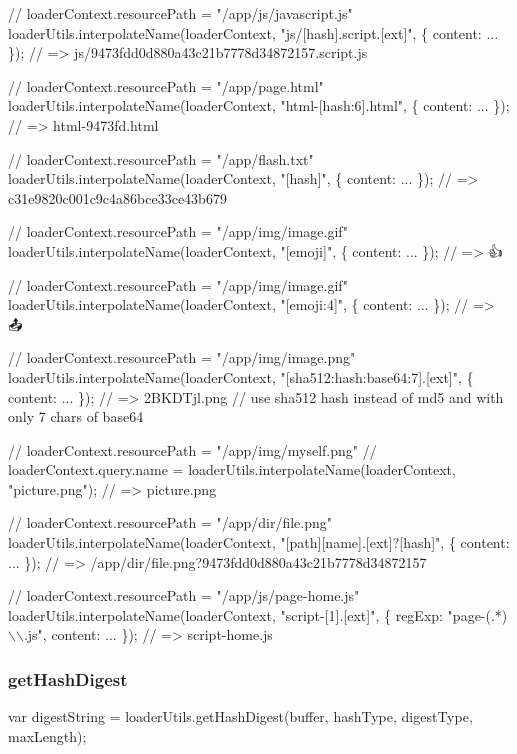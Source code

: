 \begin{DoxyCode}
// loaderContext.resourcePath = "/app/js/javascript.js"
loaderUtils.interpolateName(loaderContext, "js/[hash].script.[ext]", \{ content: ... \});
// => js/9473fdd0d880a43c21b7778d34872157.script.js

// loaderContext.resourcePath = "/app/page.html"
loaderUtils.interpolateName(loaderContext, "html-[hash:6].html", \{ content: ... \});
// => html-9473fd.html

// loaderContext.resourcePath = "/app/flash.txt"
loaderUtils.interpolateName(loaderContext, "[hash]", \{ content: ... \});
// => c31e9820c001c9c4a86bce33ce43b679

// loaderContext.resourcePath = "/app/img/image.gif"
loaderUtils.interpolateName(loaderContext, "[emoji]", \{ content: ... \});
// => 👍

// loaderContext.resourcePath = "/app/img/image.gif"
loaderUtils.interpolateName(loaderContext, "[emoji:4]", \{ content: ... \});
// => 🙍🏢📤🐝

// loaderContext.resourcePath = "/app/img/image.png"
loaderUtils.interpolateName(loaderContext, "[sha512:hash:base64:7].[ext]", \{ content: ... \});
// => 2BKDTjl.png
// use sha512 hash instead of md5 and with only 7 chars of base64

// loaderContext.resourcePath = "/app/img/myself.png"
// loaderContext.query.name =
loaderUtils.interpolateName(loaderContext, "picture.png");
// => picture.png

// loaderContext.resourcePath = "/app/dir/file.png"
loaderUtils.interpolateName(loaderContext, "[path][name].[ext]?[hash]", \{ content: ... \});
// => /app/dir/file.png?9473fdd0d880a43c21b7778d34872157

// loaderContext.resourcePath = "/app/js/page-home.js"
loaderUtils.interpolateName(loaderContext, "script-[1].[ext]", \{ regExp: "page-(.*)\(\backslash\)\(\backslash\).js", content: ... \});
// => script-home.js
\end{DoxyCode}


\subsubsection*{{\ttfamily get\+Hash\+Digest}}


\begin{DoxyCode}
var digestString = loaderUtils.getHashDigest(buffer, hashType, digestType, maxLength);
\end{DoxyCode}




